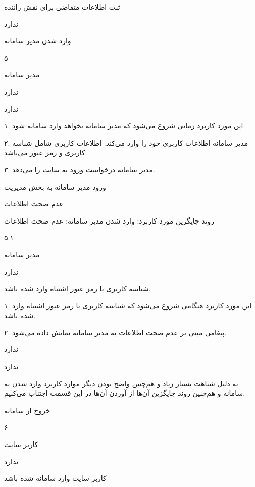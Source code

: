 ثبت اطلاعات متقاضی برای نقش راننده

ندارد

\newpage

وارد شدن مدیر سامانه

۵

مدیر سامانه

ندارد

ندارد


۱. این مورد کاربرد زمانی شروع می‌شود که مدیر سامانه بخواهد وارد سامانه شود.

۲. مدیر سامانه اطلاعات کاربری خود را وارد می‌کند. اطلاعات کاربری شامل شناسه کاربری و رمز عبور می‌باشد.

۳. مدیر سامانه درخواست ورود به سایت را می‌دهد.

ورود مدیر سامانه به بخش مدیریت

عدم صحت اطلاعات

\newpage

روند جایگزین مورد کاربرد: وارد شدن مدیر سامانه: عدم صحت اطلاعات

۵.۱

مدیر سامانه

ندارد

شناسه کاربری یا رمز عبور اشتباه وارد شده باشد.


۱. این مورد کاربرد هنگامی شروع می‌شود که شناسه کاربری یا رمز عبور اشتباه وارد شده باشد.

۲. پیغامی مبنی بر عدم صحت اطلاعات به مدیر سامانه نمایش داده می‌شود.

ندارد

ندارد

 به دلیل شباهت بسیار زیاد و هم‌چنین واضح بودن دیگر موارد کاربرد وارد شدن به سامانه و هم‌چنین روند جایگزین آن‌ها از آوردن آن‌ها در این قسمت اجتناب می‌کنیم.

\newpage

خروج از سامانه

۶

کاربر سایت

ندارد

کاربر سایت وارد سامانه شده باشد

